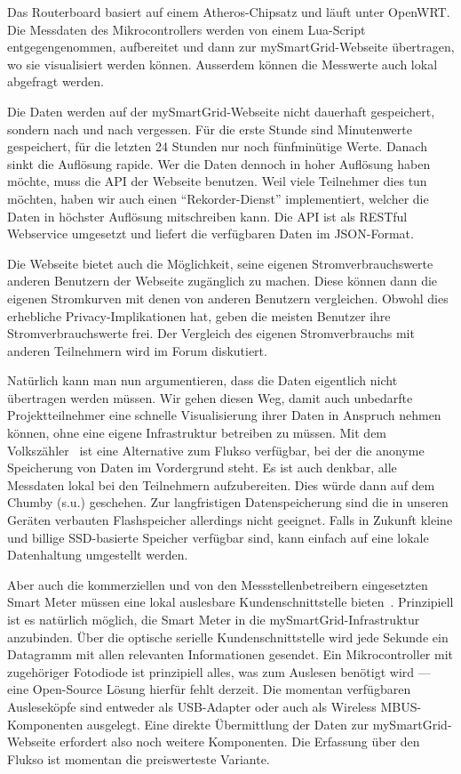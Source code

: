 \documentclass[12pt,BCOR=8.5mm]{scrartcl}
\begin{document}
Das Routerboard basiert auf einem Atheros-Chipsatz und läuft unter
OpenWRT. Die Messdaten des Mikrocontrollers werden von einem Lua-Script
entgegengenommen, aufbereitet und dann zur mySmartGrid-Webseite
übertragen, wo sie visualisiert werden können. Ausserdem können die
Messwerte auch lokal abgefragt werden.

Die Daten werden auf der mySmartGrid-Webseite nicht dauerhaft
gespeichert, sondern nach und nach vergessen. Für die erste Stunde sind
Minutenwerte gespeichert, für die letzten 24 Stunden nur noch
fünfminütige Werte. Danach sinkt die Auflösung rapide. Wer die Daten
dennoch in hoher Auflösung haben möchte, muss die API der Webseite
benutzen. Weil viele Teilnehmer dies tun möchten, haben wir auch einen
"`Rekorder-Dienst"' implementiert, welcher die Daten in höchster
Auflösung mitschreiben kann. Die API ist als RESTful Webservice
umgesetzt und liefert die verfügbaren Daten im JSON-Format.

Die Webseite bietet auch die Möglichkeit, seine eigenen
Stromverbrauchswerte anderen Benutzern der Webseite zugänglich zu
machen. Diese können dann die eigenen Stromkurven mit denen von
anderen Benutzern vergleichen. Obwohl dies erhebliche
Privacy-Implikationen hat, geben die meisten Benutzer ihre
Stromverbrauchswerte frei. Der Vergleich des eigenen Stromverbrauchs mit
anderen Teilnehmern wird im Forum diskutiert.

Natürlich kann man nun argumentieren, dass die Daten eigentlich nicht
übertragen werden müssen. Wir gehen diesen Weg, damit auch unbedarfte
Projektteilnehmer eine schnelle Visualisierung ihrer Daten in Anspruch
nehmen können, ohne eine eigene Infrastruktur betreiben zu müssen. Mit
dem Volkszähler~\cite{web:volkszaehler} ist eine Alternative zum Flukso
verfügbar, bei der die anonyme Speicherung von Daten im Vordergrund
steht. Es ist auch denkbar, alle Messdaten lokal bei den
Teilnehmern aufzubereiten. Dies würde dann auf dem Chumby (s.u.)
geschehen. Zur langfristigen Datenspeicherung sind die in unseren
Geräten verbauten Flashspeicher allerdings nicht geeignet. Falls in
Zukunft kleine und billige SSD-basierte Speicher verfügbar sind, kann
einfach auf eine lokale Datenhaltung umgestellt werden.

Aber auch die kommerziellen und von den Messstellenbetreibern
eingesetzten Smart Meter müssen eine lokal auslesbare
Kundenschnittstelle bieten~\cite{bundesnetzagentur10position}. 
Prinzipiell ist es natürlich möglich, die Smart
Meter in die mySmartGrid-Infrastruktur anzubinden. Über die optische
serielle Kundenschnittstelle wird jede Sekunde ein Datagramm mit allen
relevanten Informationen gesendet. Ein Mikrocontroller mit zugehöriger
Fotodiode ist prinzipiell alles, was zum Auslesen benötigt wird --- eine
Open-Source Lösung hierfür fehlt derzeit.
Die momentan verfügbaren Ausleseköpfe sind entweder als
USB-Adapter oder auch als Wireless MBUS-Komponenten ausgelegt. Eine
direkte Übermittlung der Daten zur mySmartGrid-Webseite erfordert also
noch weitere Komponenten. Die Erfassung über den Flukso ist momentan die
preiswerteste Variante.
\end{document}
